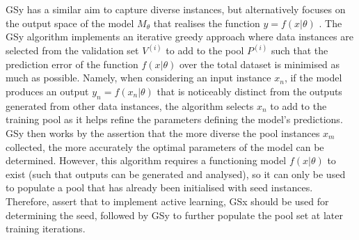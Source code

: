 \documentclass[a4paper, 11pt]{report}
\begin{document}
    GSy has a similar aim to capture diverse instances, but alternatively focuses on the output space of the model $M_{\theta}$ that realises the function $y = f( x \vert \theta )$ \citep{wu-2019}. The GSy algorithm implements an iterative greedy approach where data instances are selected from the validation set $V^{(i)}$ to add to the pool $P^{(i)}$ such that the prediction error of the function $f( x \vert \theta )$ over the total dataset is minimised as much as possible. Namely, when considering an input instance $x_n$, if the model produces an output $y_n = f( x_n \vert \theta )$ that is noticeably distinct from the outputs generated from other data instances, the algorithm selects $x_n$ to add to the training pool as it helps refine the parameters defining the model's predictions. GSy then works by the assertion that the more diverse the pool instances $x_m$ collected, the more accurately the optimal parameters of the model can be determined. However, this algorithm requires a functioning model $f( x \vert \theta )$ to exist (such that outputs can be generated and analysed), so it can only be used to populate a pool that has already been initialised with seed instances. Therefore, \citet{wu-2019} assert that to implement active learning, GSx should be used for determining the seed, followed by GSy to further populate the pool set at later training iterations.
\end{document}
